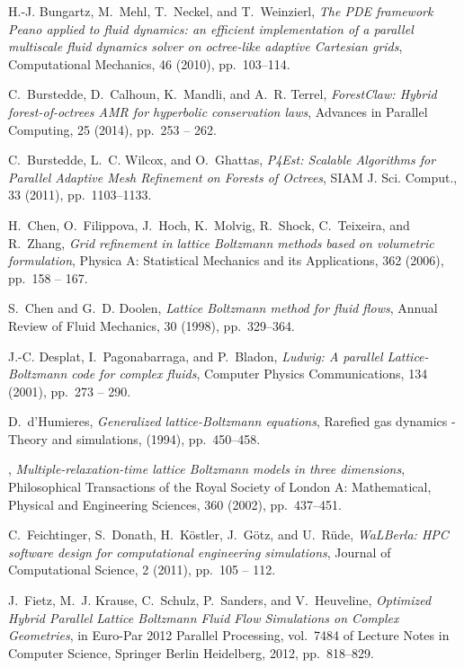 \documentclass[final,leqno,onefignum,onetabnum]{siamltex1213}
\begin{document}
\begin{thebibliography}{10}
{\sc H.-J. Bungartz, M.~Mehl, T.~Neckel, and T.~Weinzierl}, {\em The {PDE}
  framework {Peano} applied to fluid dynamics: an efficient implementation of a
  parallel multiscale fluid dynamics solver on octree-like adaptive {Cartesian}
  grids}, Computational Mechanics, 46 (2010), pp.~103--114.

{\sc C.~Burstedde, D.~Calhoun, K.~Mandli, and A.~R. Terrel}, {\em {ForestClaw}:
  {Hybrid} forest-of-octrees {AMR} for hyperbolic conservation laws}, Advances
  in Parallel Computing, 25 (2014), pp.~253 -- 262.

{\sc C.~Burstedde, L.~C. Wilcox, and O.~Ghattas}, {\em {P4Est: Scalable
  Algorithms for Parallel Adaptive Mesh Refinement on Forests of Octrees}},
  SIAM J. Sci. Comput., 33 (2011), pp.~1103--1133.

{\sc H.~Chen, O.~Filippova, J.~Hoch, K.~Molvig, R.~Shock, C.~Teixeira, and
  R.~Zhang}, {\em {Grid refinement in lattice Boltzmann methods based on
  volumetric formulation}}, Physica A: Statistical Mechanics and its
  Applications, 362 (2006), pp.~158 -- 167.

{\sc S.~Chen and G.~D. Doolen}, {\em Lattice {Boltzmann} method for fluid
  flows}, Annual Review of Fluid Mechanics, 30 (1998), pp.~329--364.

{\sc J.-C. Desplat, I.~Pagonabarraga, and P.~Bladon}, {\em Ludwig: A parallel
  {Lattice-Boltzmann} code for complex fluids}, Computer Physics
  Communications, 134 (2001), pp.~273 -- 290.

{\sc D.~d'Humieres}, {\em Generalized lattice-{Boltzmann} equations}, Rarefied
  gas dynamics - Theory and simulations,  (1994), pp.~450--458.

\leavevmode\vrule height 2pt depth -1.6pt width 23pt, {\em
  Multiple-relaxation-time lattice {Boltzmann} models in three dimensions},
  Philosophical Transactions of the Royal Society of London A: Mathematical,
  Physical and Engineering Sciences, 360 (2002), pp.~437--451.

{\sc C.~Feichtinger, S.~Donath, H.~Köstler, J.~Götz, and U.~Rüde}, {\em
  {WaLBerla}: {HPC} software design for computational engineering simulations},
  Journal of Computational Science, 2 (2011), pp.~105 -- 112.

{\sc J.~Fietz, M.~J. Krause, C.~Schulz, P.~Sanders, and V.~Heuveline}, {\em
  {Optimized Hybrid Parallel Lattice Boltzmann Fluid Flow Simulations on
  Complex Geometries}}, in Euro-Par 2012 Parallel Processing, vol.~7484 of
  Lecture Notes in Computer Science, Springer Berlin Heidelberg, 2012,
  pp.~818--829.


\end{thebibliography}
\end{document}
